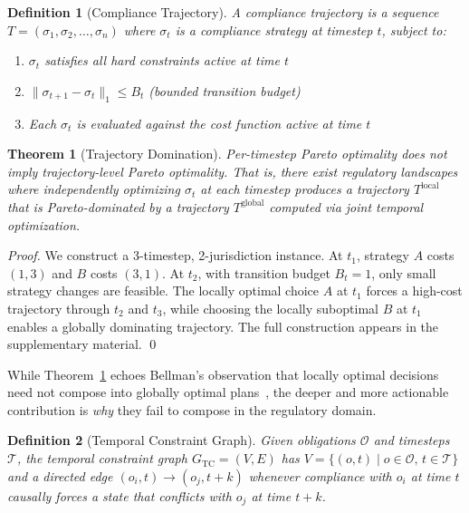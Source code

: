 \documentclass[11pt,twocolumn]{article}
\newtheorem{theorem}{Theorem}
\newtheorem{definition}{Definition}
\begin{document}
\begin{definition}[Compliance Trajectory]
A compliance trajectory is a sequence
$T = (\sigma_1, \sigma_2, \ldots, \sigma_n)$ where $\sigma_t$ is a compliance
strategy at timestep $t$, subject to:
\begin{enumerate}[nosep,leftmargin=*]
  \item $\sigma_t$ satisfies all hard constraints active at time $t$
  \item $\|\sigma_{t+1} - \sigma_t\|_1 \leq B_t$ (bounded transition budget)
  \item Each $\sigma_t$ is evaluated against the cost function active at time $t$
\end{enumerate}
\end{definition}

\begin{theorem}[Trajectory Domination]
\label{thm:trajectory}
Per-timestep Pareto optimality does not imply trajectory-level Pareto optimality.
That is, there exist regulatory landscapes where independently optimizing
$\sigma_t$ at each timestep produces a trajectory $T^{\text{local}}$ that is
Pareto-dominated by a trajectory $T^{\text{global}}$ computed via joint
temporal optimization.
\end{theorem}

\emph{Proof.} We construct a 3-timestep, 2-jurisdiction instance. At $t_1$,
strategy $A$ costs $(1,3)$ and $B$ costs $(3,1)$. At $t_2$, with transition
budget $B_t = 1$, only small strategy changes are feasible. The locally optimal
choice $A$ at $t_1$ forces a high-cost trajectory through $t_2$ and $t_3$,
while choosing the locally suboptimal $B$ at $t_1$ enables a globally dominating
trajectory. The full construction appears in the supplementary material. \qed

While Theorem~\ref{thm:trajectory} echoes Bellman's observation that locally
optimal decisions need not compose into globally optimal plans~\cite{bellman1957},
the deeper and more actionable contribution is \emph{why} they fail to compose
in the regulatory domain.

\begin{definition}[Temporal Constraint Graph]
Given obligations $\mathcal{O}$ and timesteps $\mathcal{T}$, the temporal
constraint graph $G_{\text{TC}} = (V, E)$ has
$V = \{(o, t) \mid o \in \mathcal{O},\, t \in \mathcal{T}\}$ and a directed edge
$(o_i, t) \to (o_j, t{+}k)$ whenever compliance with $o_i$ at time $t$ causally
forces a state that conflicts with $o_j$ at time $t{+}k$.
\end{definition}
\end{document}
